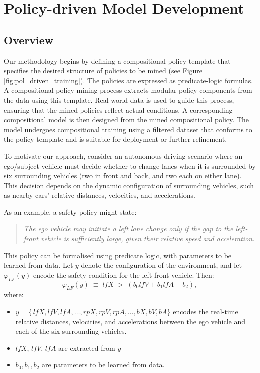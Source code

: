 \section{Policy-driven Model Development}
\label{sec:compositional_training}

\subsection{Overview}
\label{sec:comp_overview}
Our methodology begins by defining a compositional policy template that specifies the desired structure of policies to be mined  (see Figure \ref{fig:pol_driven_training}). The policies are expressed as predicate-logic formulas. A compositional policy mining process extracts modular policy components from the data using this template. Real-world data is used to guide this process, ensuring that the mined policies reflect actual conditions. A corresponding compositional model is then designed from the mined compositional policy. The model undergoes compositional training using a filtered dataset that conforms to the policy template and is suitable for deployment or further refinement.

To motivate our approach, consider an autonomous driving scenario where an ego/subject vehicle must decide whether to change lanes when it is surrounded by six surrounding vehicles (two in front and back, and two each on either lane). This decision depends on the dynamic configuration of surrounding vehicles, such as nearby cars' relative distances, velocities, and accelerations.

As an example, a safety policy might state:
\begin{quote}
\emph{The ego vehicle may initiate a left lane change only if the gap to the left-front vehicle is sufficiently large, given their relative speed and acceleration.}
\end{quote}

This policy can be formalised using predicate logic, with parameters to be learned from data. Let $y$ denote the configuration of the environment, and let $\varphi_{LF}(y)$ encode the safety condition for the left-front vehicle. Then:
\begin{equation}
 \varphi_{LF}(y)
 \;\equiv\;
 lfX \;>\; (b_0 lfV + b_1 lfA + b_2),
\label{eq:lf_policy}
\end{equation}
where:
\begin{itemize}
  \item $y = \{\,lfX, lfV, lfA,\dots, rpX, rpV, rpA, \dots, bX, bV, bA\}$ encodes the real-time relative distances, velocities, and accelerations between the ego vehicle and each of the six surrounding vehicles.  
  \item $lfX$, $lfV$, $lfA$ are extracted from $y$
  \item $b_0, b_1, b_2$ are parameters to be learned from data.
\end{itemize}

